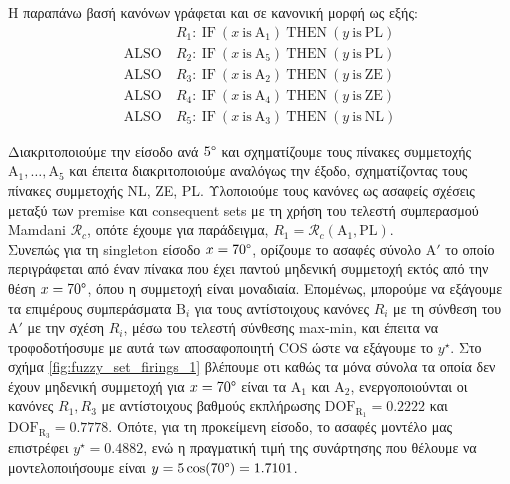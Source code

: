 \documentclass[11pt,a4paper,titlepage, oneside]{article}
\begin{document}
	Η παραπάνω βασή κανόνων γράφεται και σε κανονική μορφή ως εξής:
	\begin{align*}
		& R_1\colon\ \text{IF}\ \left( x\ \text{is}\ \text{A}_1 \right)\  \text{THEN}\ \left( y\ \text{is}\ \text{PL} \right) \\
		\text{ALSO}\ & R_2\colon\ \text{IF}\ \left( x\ \text{is}\ \text{A}_5 \right)\  \text{THEN}\ \left( y\ \text{is}\ \text{PL} \right) \\
		\text{ALSO}\ & R_3\colon\ \text{IF}\ \left( x\ \text{is}\ \text{A}_2 \right)\  \text{THEN}\ \left( y\ \text{is}\ \text{ZE} \right) \\
		\text{ALSO}\ & R_4\colon\ \text{IF}\ \left( x\ \text{is}\ \text{A}_4 \right)\  \text{THEN}\ \left( y\ \text{is}\ \text{ZE} \right) \\
		\text{ALSO}\ & R_5\colon\ \text{IF}\ \left( x\ \text{is}\ \text{A}_3 \right)\  \text{THEN}\ \left( y\ \text{is}\ \text{NL} \right)
	\end{align*}

	Διακριτοποιούμε την είσοδο ανά $5\degree$ και σχηματίζουμε τους πίνακες συμμετοχής $\text{A}_1, \dotsc, \text{A}_5$ και έπειτα διακριτοποιούμε αναλόγως την έξοδο, σχηματίζοντας τους πίνακες συμμετοχής NL, ZE, PL. Υλοποιούμε τους κανόνες ως ασαφείς σχέσεις μεταξύ των premise και consequent sets με τη χρήση του τελεστή συμπερασμού Mamdani $\mathcal{R}_c$, οπότε έχουμε για παράδειγμα, $R_1 = \mathcal{R}_c \left(\text{A}_1, \text{PL}\right)$.\\
		
	Συνεπώς για τη singleton είσοδο $x = 70\degree$, ορίζουμε το ασαφές σύνολο $\text{A}'$ το οποίο περιγράφεται από έναν πίνακα που έχει παντού μηδενική συμμετοχή εκτός από την θέση $x = 70\degree$, όπου η συμμετοχή είναι μοναδιαία. Επομένως, μπορούμε να εξάγουμε τα επιμέρους συμπεράσματα $\text{B}_i$ για τους αντίστοιχους κανόνες $R_i$ με τη σύνθεση του $\text{A}'$ με την σχέση $R_i$, μέσω του τελεστή σύνθεσης max-min, και έπειτα να τροφοδοτήοσυμε με αυτά των αποσαφοποιητή COS ώστε να εξάγουμε το $y^\star$. Στο σχήμα \ref{fig:fuzzy_set_firings_1} βλέπουμε οτι καθώς τα μόνα σύνολα τα οποία δεν έχουν μηδενική συμμετοχή για $x = 70\degree$ είναι τα $\text{A}_1$ και $\text{A}_2$, ενεργοποιούνται οι κανόνες $R_1, R_3$ με αντίστοιχους βαθμούς εκπλήρωσης $\text{DOF}_{\text{R}_1} = 0.2222$ και $\text{DOF}_{\text{R}_3} = 0.7778$. Οπότε, για τη προκείμενη είσοδο, το ασαφές μοντέλο μας επιστρέφει $y^\star = 0.4882$, ενώ η πραγματική τιμή της συνάρτησης που θέλουμε να μοντελοποιήσουμε είναι $y = 5 \cos(70\degree) = 1.7101$.\\
	
\end{document}
